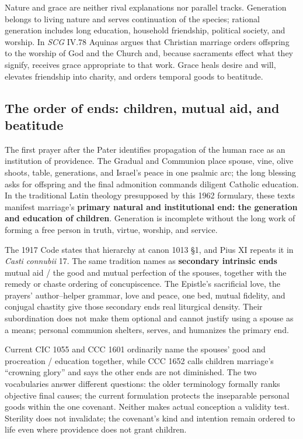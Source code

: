 \begin{deepstudy}
Nature and grace are neither rival explanations nor parallel tracks. Generation belongs to living nature and serves continuation of the species; rational generation includes long education, household friendship, political society, and worship. In \emph{SCG} IV.78 Aquinas argues that Christian marriage orders offspring to the worship of God and the Church and, because sacraments effect what they signify, receives grace appropriate to that work. Grace heals desire and will, elevates friendship into charity, and orders temporal goods to beatitude.

\sectionguard
\subsection*{The order of ends: children, mutual aid, and beatitude\enspace{}}

The first prayer after the Pater identifies propagation of the human race as an institution of providence. The Gradual and Communion place spouse, vine, olive shoots, table, generations, and Israel's peace in one psalmic arc; the long blessing asks for offspring and the final admonition commands diligent Catholic education. In the traditional Latin theology presupposed by this 1962 formulary, these texts manifest marriage's \textbf{primary natural and institutional end: the generation and education of children}. Generation is incomplete without the long work of forming a free person in truth, virtue, worship, and service.

The 1917 Code states that hierarchy at canon 1013 \S1, and Pius XI repeats it in \emph{Casti connubii} 17. The same tradition names as \textbf{secondary intrinsic ends} mutual aid / the good and mutual perfection of the spouses, together with the remedy or chaste ordering of concupiscence. The Epistle's sacrificial love, the prayers' author--helper grammar, love and peace, one bed, mutual fidelity, and conjugal chastity give those secondary ends real liturgical density. Their subordination does not make them optional and cannot justify using a spouse as a means; personal communion shelters, serves, and humanizes the primary end.

Current CIC 1055 and CCC 1601 ordinarily name the spouses' good and procreation / education together, while CCC 1652 calls children marriage's ``crowning glory'' and says the other ends are not diminished. The two vocabularies answer different questions: the older terminology formally ranks objective final causes; the current formulation protects the inseparable personal goods within the one covenant. Neither makes actual conception a validity test. Sterility does not invalidate; the covenant's kind and intention remain ordered to life even where providence does not grant children.


\end{deepstudy}
